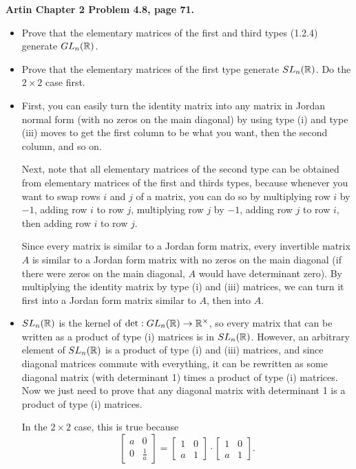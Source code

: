 \documentclass{article}
\begin{document}
\bigskip
\begin{prob}
    \textbf{Artin Chapter 2 Problem 4.8, page 71.}
    \begin{itemize}
        \item Prove that the elementary matrices of the first and third types (1.2.4) generate $GL_n(\mathbb{R})$.
        \item Prove that the elementary matrices of the first type generate $SL_n(\mathbb{R})$. Do the $2 \times 2$ case first.
    \end{itemize}
\end{prob}
\begin{itemize}
    \item First, you can easily turn the identity matrix into any matrix in Jordan normal form (with no zeros on the main diagonal) by using type (i) and type (iii) moves to get the first column to be what you want, then the second column, and so on.
        \par
        Next, note that all elementary matrices of the second type can be obtained from elementary matrices of the first and thirds types, because whenever you want to swap rows $i$ and $j$ of a matrix, you can do so by multiplying row $i$ by $-1$, adding row $i$ to row $j$, multiplying row $j$ by $-1$, adding row $j$ to row $i$, then adding row $i$ to row $j$.
        \par
        Since every matrix is similar to a Jordan form matrix, every invertible matrix $A$ is similar to a Jordan form matrix with no zeros on the main diagonal (if there were zeros on the main diagonal, $A$ would have determinant zero). By multiplying the identity matrix by type (i) and (iii) matrices, we can turn it first into a Jordan form matrix similar to $A$, then into $A$.
    \item $SL_n(\mathbb{R})$ is the kernel of $\det: GL_n(\mathbb{R}) \rightarrow \mathbb{R}^\times$, so every matrix that can be written as a product of type (i) matrices is in $SL_n(\mathbb{R})$. However, an arbitrary element of $SL_n(\mathbb{R})$ is a product of type (i) and (iii) matrices, and since diagonal matrices commute with everything, it can be rewritten as some diagonal matrix (with determinant 1) times a product of type (i) matrices. Now we just need to prove that any diagonal matrix with determinant 1 is a product of type (i) matrices.
        \par
        In the $2 \times 2$ case, this is true because
        \[ \begin{bmatrix}
            a & 0 \\
            0 & \frac{1}{a}
        \end{bmatrix} = \begin{bmatrix}
            1 & 0 \\
            a & 1
        \end{bmatrix} \cdot \begin{bmatrix}
            1 & 0 \\
            a & 1
        \end{bmatrix}. \]
\end{itemize}
\end{document}
